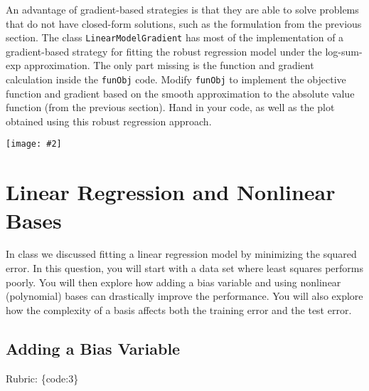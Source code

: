 \documentclass{article}
\def\rubric#1{\gre{Rubric: \{#1\}}}{}
\def\blu#1{{\color{blu}#1}}
\def\gre#1{{\color{gre}#1}}
\newcommand{\centerfig}[2]{\begin{center}\texttt{[image: \#2]}\end{center}}
\begin{document}
An advantage of gradient-based strategies is that they are able to solve
problems that do not have closed-form solutions, such as the formulation from the
previous section. The class \texttt{LinearModelGradient} has most of the implementation
of a gradient-based strategy for fitting the robust regression model under the log-sum-exp approximation.
The only part missing is the function and gradient calculation inside the \texttt{funObj} code.
\blu{Modify \texttt{funObj} to implement the objective function and gradient based on the smooth
approximation to the absolute value function (from the previous section). Hand in your code, as well
as the plot obtained using this robust regression approach.}

\begin{center}
    
\end{center}

\centerfig{1}{../figs/least_squares_robust.pdf}



\section{Linear Regression and Nonlinear Bases}

In class we discussed fitting a linear regression model by minimizing the squared error.
In this question, you will start with a data set where least squares performs poorly.
You will then explore how adding a bias variable and using nonlinear (polynomial) bases can drastically improve the performance.
You will also explore how the complexity of a basis affects both the training error and the test error.

\subsection{Adding a Bias Variable}
\label{biasvar}
\rubric{code:3}
\end{document}
